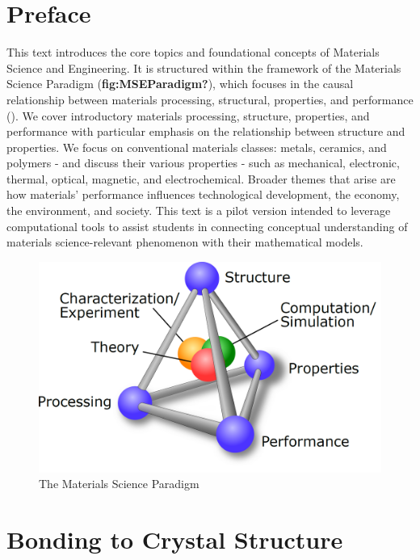 \documentclass{book}
\begin{document}
\setcounter{tocdepth}{3}
\tableofcontents

\mainmatter

\hypertarget{preface}{%
\chapter{Preface}\label{preface}}

This text introduces the core topics and foundational concepts of Materials
Science and Engineering. It is structured within the framework of the
Materials Science Paradigm (\textbf{fig:MSEParadigm?}), which focuses in the
causal relationship between materials processing, structural, properties, and
performance (). We cover introductory materials processing, structure,
properties, and performance with particular emphasis on the relationship
between structure and properties. We focus on conventional materials classes:
metals, ceramics, and polymers - and discuss their various properties - such
as mechanical, electronic, thermal, optical, magnetic, and electrochemical.
Broader themes that arise are how materials' performance influences
technological development, the economy, the environment, and society. This
text is a pilot version intended to leverage computational tools to assist
students in connecting conceptual understanding of materials science-relevant
phenomenon with their mathematical models.

\begin{figure}
\hypertarget{fig:MSEParadigm}{%
\centering
\includegraphics{images/figures/MSE-paradigm.png}
\caption{The Materials Science Paradigm}\label{fig:MSEParadigm}
}
\end{figure}

\hypertarget{bonding-to-crystal-structure}{%
\chapter{Bonding to Crystal Structure}\label{bonding-to-crystal-structure}}
\end{document}
